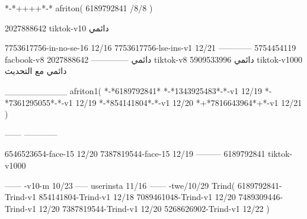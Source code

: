 *-*++++*-*
afriton(
6189792841 /8/8
)

2027888642 tiktok-v10
دائمي

7753617756-in-no-se-16 12/16
7753617756-lse-ins-v1 12/21
------------
5754454119 facbook-v8
دائمي
--------------
2027888642 tiktok-v8
دائمي
5909533996 tiktok-v1000
دائمي مع التحديث

__________
afriton1(
*-*6189792841*
*-*1343925483*-*-v1 12/19
*-*7361295055*-*-v1 12/19
*-*854141804*-*-v1 12/20
*+*7816643964*+*-v1 12/21
)

------
------------


6546523654-face-15 12/20
7387819544-face-15 12/19
---------
6189792841 tiktok-v1000
 
------
-v10-m 10/23
-----
userinsta 11/16
------
-twe/10/29
Trind(
6189792841-Trind-v1 
854141804-Trind-v1 12/18
7089461048-Trind-v1 12/20
7489309446-Trind-v1 12/20
7387819544-Trind-v1 12/20
5268626902-Trind-v1 12/22
)
